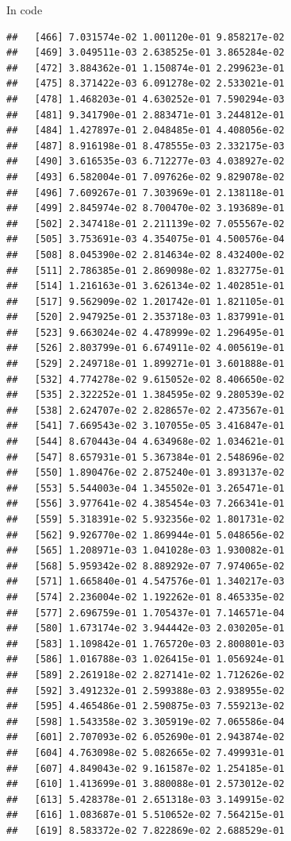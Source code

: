 \documentclass[ignorenonframetext,]{beamer}
\begin{document}
\begin{frame}[fragile]{In code}
\begin{verbatim}
##   [466] 7.031574e-02 1.001120e-01 9.858217e-02
##   [469] 3.049511e-03 2.638525e-01 3.865284e-02
##   [472] 3.884362e-01 1.150874e-01 2.299623e-01
##   [475] 8.371422e-03 6.091278e-02 2.533021e-01
##   [478] 1.468203e-01 4.630252e-01 7.590294e-03
##   [481] 9.341790e-01 2.883471e-01 3.244812e-01
##   [484] 1.427897e-01 2.048485e-01 4.408056e-02
##   [487] 8.916198e-01 8.478555e-03 2.332175e-03
##   [490] 3.616535e-03 6.712277e-03 4.038927e-02
##   [493] 6.582004e-01 7.097626e-02 9.829078e-02
##   [496] 7.609267e-01 7.303969e-01 2.138118e-01
##   [499] 2.845974e-02 8.700470e-02 3.193689e-01
##   [502] 2.347418e-01 2.211139e-02 7.055567e-02
##   [505] 3.753691e-03 4.354075e-01 4.500576e-04
##   [508] 8.045390e-02 2.814634e-02 8.432400e-02
##   [511] 2.786385e-01 2.869098e-02 1.832775e-01
##   [514] 1.216163e-01 3.626134e-02 1.402851e-01
##   [517] 9.562909e-02 1.201742e-01 1.821105e-01
##   [520] 2.947925e-01 2.353718e-03 1.837991e-01
##   [523] 9.663024e-02 4.478999e-02 1.296495e-01
##   [526] 2.803799e-01 6.674911e-02 4.005619e-01
##   [529] 2.249718e-01 1.899271e-01 3.601888e-01
##   [532] 4.774278e-02 9.615052e-02 8.406650e-02
##   [535] 2.322252e-01 1.384595e-02 9.280539e-02
##   [538] 2.624707e-02 2.828657e-02 2.473567e-01
##   [541] 7.669543e-02 3.107055e-05 3.416847e-01
##   [544] 8.670443e-04 4.634968e-02 1.034621e-01
##   [547] 8.657931e-01 5.367384e-01 2.548696e-02
##   [550] 1.890476e-02 2.875240e-01 3.893137e-02
##   [553] 5.544003e-04 1.345502e-01 3.265471e-01
##   [556] 3.977641e-02 4.385454e-03 7.266341e-01
##   [559] 5.318391e-02 5.932356e-02 1.801731e-02
##   [562] 9.926770e-02 1.869944e-01 5.048656e-02
##   [565] 1.208971e-03 1.041028e-03 1.930082e-01
##   [568] 5.959342e-02 8.889292e-07 7.974065e-02
##   [571] 1.665840e-01 4.547576e-01 1.340217e-03
##   [574] 2.236004e-02 1.192262e-01 8.465335e-02
##   [577] 2.696759e-01 1.705437e-01 7.146571e-04
##   [580] 1.673174e-02 3.944442e-03 2.030205e-01
##   [583] 1.109842e-01 1.765720e-03 2.800801e-03
##   [586] 1.016788e-03 1.026415e-01 1.056924e-01
##   [589] 2.261918e-02 2.827141e-02 1.712626e-02
##   [592] 3.491232e-01 2.599388e-03 2.938955e-02
##   [595] 4.465486e-01 2.590875e-03 7.559213e-02
##   [598] 1.543358e-02 3.305919e-02 7.065586e-04
##   [601] 2.707093e-02 6.052690e-01 2.943874e-02
##   [604] 4.763098e-02 5.082665e-02 7.499931e-01
##   [607] 4.849043e-02 9.161587e-02 1.254185e-01
##   [610] 1.413699e-01 3.880088e-01 2.573012e-02
##   [613] 5.428378e-01 2.651318e-03 3.149915e-02
##   [616] 1.083687e-01 5.510652e-02 7.564215e-01
##   [619] 8.583372e-02 7.822869e-02 2.688529e-01

\end{verbatim}
\end{frame}
\end{document}
